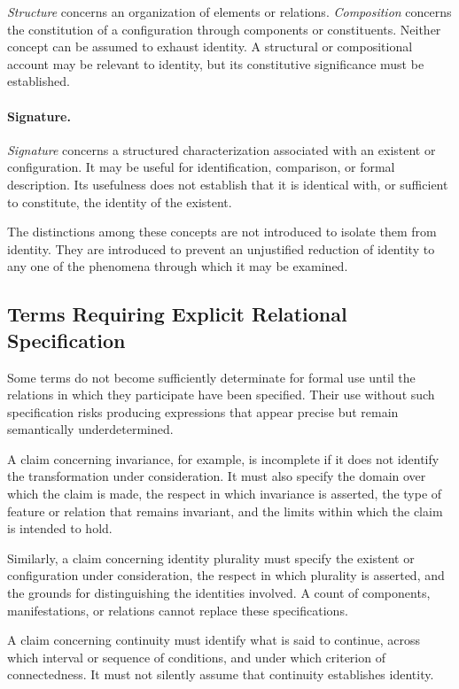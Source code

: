 \emph{Structure} concerns an organization of
elements or relations. \emph{Composition} concerns
the constitution of a configuration through
components or constituents. Neither concept
can be assumed to exhaust identity. A structural
or compositional account may be relevant to
identity, but its constitutive significance
must be established.

\paragraph{Signature.}

\emph{Signature} concerns a structured
characterization associated with an existent
or configuration. It may be useful for
identification, comparison, or formal description.
Its usefulness does not establish that it is
identical with, or sufficient to constitute,
the identity of the existent.

The distinctions among these concepts are not
introduced to isolate them from identity. They
are introduced to prevent an unjustified reduction
of identity to any one of the phenomena through
which it may be examined.

\subsection{Terms Requiring Explicit Relational Specification}

Some terms do not become sufficiently determinate
for formal use until the relations in which they
participate have been specified. Their use without
such specification risks producing expressions
that appear precise but remain semantically
underdetermined.

A claim concerning invariance, for example, is
incomplete if it does not identify the transformation
under consideration. It must also specify the
domain over which the claim is made, the respect
in which invariance is asserted, the type of
feature or relation that remains invariant,
and the limits within which the claim is intended
to hold.

Similarly, a claim concerning identity plurality
must specify the existent or configuration
under consideration, the respect in which
plurality is asserted, and the grounds for
distinguishing the identities involved. A count
of components, manifestations, or relations
cannot replace these specifications.

A claim concerning continuity must identify
what is said to continue, across which interval
or sequence of conditions, and under which
criterion of connectedness. It must not silently
assume that continuity establishes identity.

